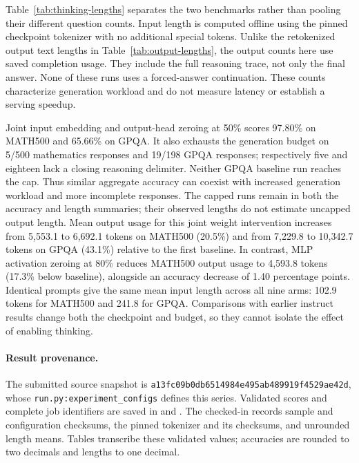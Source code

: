 \begin{table}[ht]
\centering
\caption{Mean input and output tokens per question for the thinking series.
Input is the initial prompt including the chat template; output is server-reported
completion usage, including reasoning, the final answer and generated special
tokens. All responses, including incorrect and capped responses, enter the mean.}
\label{tab:thinking-lengths}

\end{table}

Table~\ref{tab:thinking-lengths} separates the two benchmarks rather than
pooling their different question counts. Input length is computed offline using
the pinned checkpoint tokenizer with no additional special tokens. Unlike the
retokenized output text lengths in Table~\ref{tab:output-lengths}, the output
counts here use saved completion usage. They include the full reasoning trace,
not only the final answer. None of these runs uses a forced-answer continuation.
These counts characterize generation workload and do not measure latency or
establish a serving speedup.

Joint input embedding and output-head zeroing at 50\% scores 97.80\% on
MATH500 and 65.66\% on GPQA. It also exhausts the generation budget on 5/500
mathematics responses and 19/198 GPQA responses; respectively five and eighteen
lack a closing reasoning delimiter. Neither GPQA baseline run reaches the cap.
Thus similar aggregate accuracy can coexist with increased generation workload
and more incomplete responses. The capped runs remain in both the accuracy and
length summaries; their observed lengths do not estimate uncapped output length.
Mean output usage for this joint weight intervention increases from 5,553.1 to
6,692.1 tokens on MATH500 (20.5\%) and from 7,229.8 to 10,342.7 tokens on
GPQA (43.1\%) relative to the first baseline. In contrast, MLP activation
zeroing at 80\% reduces MATH500 output usage to 4,593.8 tokens (17.3\%
below baseline), alongside an accuracy decrease of 1.40 percentage points.
Identical prompts give the same mean input length across all nine arms:
102.9 tokens for MATH500 and 241.8 for GPQA.
Comparisons with earlier instruct results change both the checkpoint and budget,
so they cannot isolate the effect of enabling thinking.

\paragraph{Result provenance.}
{\raggedright
The submitted source snapshot is
\texttt{a13fc09b0db6514984e495ab489919f4529ae42d}, whose
\texttt{run.py:experiment\_configs} defines this series. Validated scores and
complete job identifiers are saved in
 and
. The checked-in
 records sample and
configuration checksums, the pinned tokenizer and its checksums, and unrounded
length means. Tables transcribe these validated values; accuracies are rounded
to two decimals and lengths to one decimal.
\par}
